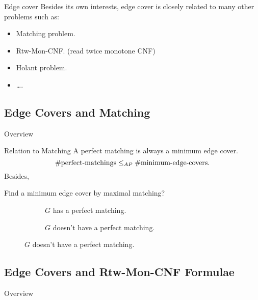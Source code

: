 \documentclass[mathserif]{beamer}
\begin{document}
\begin{frame}{Edge cover}
	Besides its own interests, edge cover is closely related to many other problems such as:
	\begin{itemize}
		\item Matching problem.
		\item Rtw-Mon-CNF. (read twice monotone CNF)
		\item Holant problem.
		\item \dots.
	\end{itemize}
\end{frame}

\subsection{Edge Covers and Matching}
\begin{frame}{Overview}
	\tableofcontents[currentsubsection, hideothersubsections, sectionstyle=show/shaded, subsectionstyle=show/shaded]
\end{frame}
\begin{frame}{Relation to Matching}
	A perfect matching is always a minimum edge cover.
	\[ \#\hbox{perfect-matchings} \leq_{AP} \#\hbox{minimum-edge-covers}.\]
	\bigskip 
	Besides,
	\begin{example}
		Find a minimum edge cover by maximal matching?
		\begin{figure}[htp]
			\begin{subfigure}[b]{0.49\textwidth}
				\centering
				
				\caption{$G$ has a perfect matching.}
			\end{subfigure}
			\hfill
			\begin{subfigure}[b]{0.49\textwidth}
				\centering
				

				\caption{$G$ doesn't have a perfect matching.}
			\end{subfigure}
		\end{figure}
	\end{example}
\end{frame}

\subsection{Edge Covers and Rtw-Mon-CNF Formulae}
\begin{frame}{Overview}
	\tableofcontents[currentsubsection, hideothersubsections, sectionstyle=show/shaded, subsectionstyle=show/shaded]
\end{frame}
\end{document}
